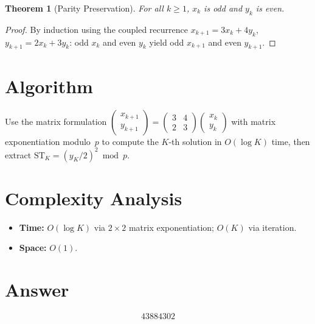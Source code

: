 \documentclass[11pt]{article}
\newtheorem{theorem}{Theorem}
\begin{document}
\begin{theorem}[Parity Preservation]
For all $k\ge 1$, $x_k$ is odd and $y_k$ is even.
\end{theorem}

\begin{proof}
By induction using the coupled recurrence $x_{k+1}=3x_k+4y_k$, $y_{k+1}=2x_k+3y_k$: odd $x_k$ and even $y_k$ yield odd $x_{k+1}$ and even $y_{k+1}$.
\end{proof}

\section{Algorithm}

Use the matrix formulation
$\begin{pmatrix}x_{k+1}\\y_{k+1}\end{pmatrix}=\begin{pmatrix}3&4\\2&3\end{pmatrix}\begin{pmatrix}x_k\\y_k\end{pmatrix}$
with matrix exponentiation modulo~$p$ to compute the $K$-th solution in $O(\log K)$ time, then extract $\mathrm{ST}_K = (y_K/2)^2 \bmod p$.

\section{Complexity Analysis}

\begin{itemize}
\item \textbf{Time:} $O(\log K)$ via $2\times 2$ matrix exponentiation; $O(K)$ via iteration.
\item \textbf{Space:} $O(1)$.
\end{itemize}

\section{Answer}

\[
\boxed{43884302}
\]
\end{document}
